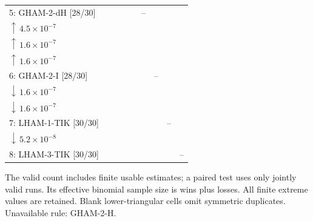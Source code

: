 \begin{table}[!htbp]
{\begin{tabular}{@{}l*{8}{c}@{}}
5: GHAM-2-dH [28/30] &  &  &  &  & -- & \shortstack{$26{:}0{:}0$\\$\uparrow\,4.5\!\times\!10^{-7}$} & \shortstack{$28{:}0{:}0$\\$\uparrow\,1.6\!\times\!10^{-7}$} & \shortstack{$28{:}0{:}0$\\$\uparrow\,1.6\!\times\!10^{-7}$} \\
6: GHAM-2-I [28/30] &  &  &  &  &  & -- & \shortstack{$0{:}28{:}0$\\$\downarrow\,1.6\!\times\!10^{-7}$} & \shortstack{$0{:}28{:}0$\\$\downarrow\,1.6\!\times\!10^{-7}$} \\
7: LHAM-1-TIK [30/30] &  &  &  &  &  &  & -- & \shortstack{$0{:}30{:}0$\\$\downarrow\,5.2\!\times\!10^{-8}$} \\
8: LHAM-3-TIK [30/30] &  &  &  &  &  &  &  & -- \\
\bottomrule
\end{tabular}%
}
\endgroup
\par\smallskip
\begin{minipage}{\linewidth}\footnotesize
The valid count includes finite usable estimates; a paired test uses only jointly valid runs. Its effective binomial sample size is wins plus losses. All finite extreme values are retained. Blank lower-triangular cells omit symmetric duplicates.
Unavailable rule: GHAM-2-H.
\end{minipage}
\end{table}
